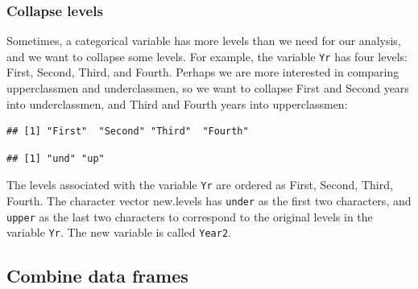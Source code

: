 \documentclass[
]{book}
\newenvironment{Shaded}{\begin{snugshade}}{\end{snugshade}}
\newcommand{\FunctionTok}[1]{\textcolor[rgb]{0.13,0.29,0.53}{\textbf{#1}}}
\newcommand{\NormalTok}[1]{#1}
\newcommand{\OtherTok}[1]{\textcolor[rgb]{0.56,0.35,0.01}{#1}}
\newcommand{\SpecialCharTok}[1]{\textcolor[rgb]{0.81,0.36,0.00}{\textbf{#1}}}
\newcommand{\StringTok}[1]{\textcolor[rgb]{0.31,0.60,0.02}{#1}}
\begin{document}
\hypertarget{collapse-levels}{%
\subsubsection{Collapse levels}\label{collapse-levels}}

Sometimes, a categorical variable has more levels than we need for our analysis, and we want to collapse some levels. For example, the variable \texttt{Yr} has four levels: First, Second, Third, and Fourth. Perhaps we are more interested in comparing upperclassmen and underclassmen, so we want to collapse First and Second years into underclassmen, and Third and Fourth years into upperclassmen:

\begin{Shaded}
\end{Shaded}

\begin{verbatim}
## [1] "First"  "Second" "Third"  "Fourth"
\end{verbatim}

\begin{Shaded}
\end{Shaded}

\begin{verbatim}
## [1] "und" "up"
\end{verbatim}

The levels associated with the variable \texttt{Yr} are ordered as First, Second, Third, Fourth. The character vector new.levels has \texttt{under} as the first two characters, and \texttt{upper} as the last two characters to correspond to the original levels in the variable \texttt{Yr}. The new variable is called \texttt{Year2}.

\hypertarget{combine-data-frames}{%
\subsection{Combine data frames}\label{combine-data-frames}}
\end{document}
